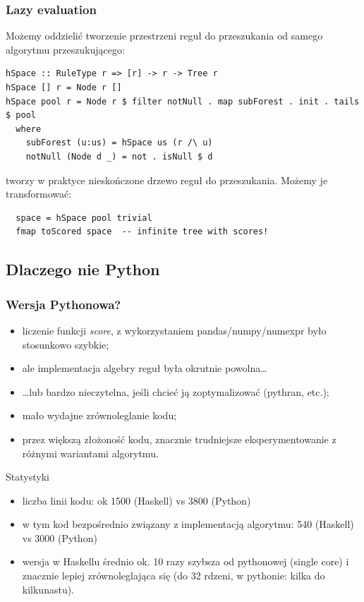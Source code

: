 \documentclass[8pt]{beamer}
\begin{document}
\begin{frame}
  \frametitle{Lazy evaluation}

  Możemy oddzielić tworzenie przestrzeni reguł do przeszukania
  od samego algorytmu przeszukującego:

\begin{verbatim}
hSpace :: RuleType r => [r] -> r -> Tree r
hSpace [] r = Node r []
hSpace pool r = Node r $ filter notNull . map subForest . init . tails $ pool
  where
    subForest (u:us) = hSpace us (r /\ u)
    notNull (Node d _) = not . isNull $ d
\end{verbatim}

  tworzy w praktyce nieskończone drzewo reguł do przeszukania.
  Możemy je transformować:

\begin{verbatim}
  space = hSpace pool trivial
  fmap toScored space  -- infinite tree with scores!
\end{verbatim}
\end{frame}

\subsection{Dlaczego nie Python}

\begin{frame}
  \frametitle{Wersja Pythonowa?}

  \begin{itemize}
  \item liczenie funkcji \emph{score}, z wykorzystaniem pandas/numpy/numexpr
    było stosunkowo szybkie;
  \item ale implementacja algebry reguł była okrutnie powolna\dots
  \item \dots lub bardzo nieczytelna, jeśli chcieć ją zoptymalizować (pythran, etc.);
  \item mało wydajne zrównoleglanie kodu;
  \item przez większą złożoność kodu, znacznie trudniejsze eksperymentowanie z
    różnymi wariantami algorytmu.
  \end{itemize}

  \pause
  \begin{block}{Statystyki}
    \begin{itemize}
    \item liczba linii kodu: ok 1500 (Haskell) vs 3800 (Python)
    \item w tym kod bezpośrednio związany z implementacją algorytmu:
      540 (Haskell) vs 3000 (Python)
    \item wersja w Haskellu średnio ok. 10 razy szybsza od pythonowej (single
      core) i znacznie lepiej zrównoleglająca się (do 32 rdzeni, w pythonie:
      kilka do kilkunastu).
    \end{itemize}
  \end{block}
\end{frame}
\end{document}
